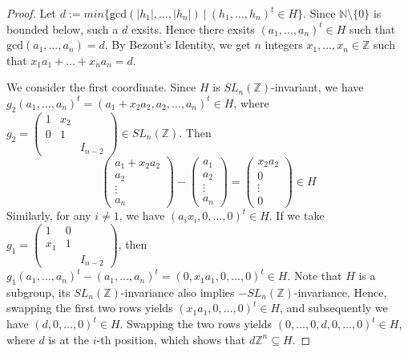 \documentclass[10pt,a4paper]{amsart}
\begin{document}
\begin{proof}

Let $d:=min\{\text{gcd}(\left|h_1\right|,\ldots,\left|h_n\right|)~|~ (h_1,\ldots,h_n)^t \in H\}$. Since $\mathbb{N}\setminus\{0\}$ is bounded below, such a $d$ exsits. Hence there exsits $(a_1,\dots,a_n)^t\in H$ such that $\text{gcd}(a_1,\dots,a_n)=d$. By Bezout’s Identity, we get $n$ integers $x_1,\dots,x_n\in \mathbb{Z}$ such that $x_1a_1+\dots+x_na_n = d$.

We consider the first coordinate. Since $H$ is $SL_{n}(\mathbb{Z})$-invariant, we have $g_2(a_1,\dots,a_n)^t = (a_1+x_2a_2,a_2,\dots,a_n)^t \in H$, where $g_2= \left(\begin{smallmatrix}
     1 & x_2 \\
     0 & 1 \\
     & & I_{n-2}
   \end{smallmatrix}\right)\in SL_{n}(\mathbb{Z})$. Then \begin{equation*}
      \left(\begin{smallmatrix}
           a_1+x_2a_2\\
           a_2\\
           \vdots\\
           a_n
       \end{smallmatrix}\right)-\left(\begin{smallmatrix}
            a_1\\
           a_2\\
           \vdots\\
           a_n
\end{smallmatrix}\right)=\left(\begin{smallmatrix}
            x_2a_2\\
           0\\
           \vdots\\
           0
       \end{smallmatrix}\right)\in H
   \end{equation*}
Similarly, for any $i\ne 1$, we have $(a_ix_i,0,\dots,0)^t \in H$. If we take $g_1= \left(\begin{smallmatrix}
     1 & 0 \\
     x_1 & 1 \\
     & & I_{n-2}
     \end{smallmatrix}\right)$, then $g_1(a_1,\dots,a_n)^t-(a_1,\dots,a_n)^t=(0,x_1a_1,0,\dots,0)^t \in H$. Note that $H$ is a subgroup, its $SL_{n}(\mathbb{Z})$-invariance also implies $-SL_{n}(\mathbb{Z})$-invariance. Hence, swapping the first two rows yields $(x_1a_1,0,\dots,0)^t\in H$, and subsequently we have $(d,0,\dots,0)^t \in H$. Swapping the two rows yields $(0,\dots,0,d,0,\dots,0)^t\in H$, where $d$ is at the $i$-th position, which shows that $d\mathbb{Z}^n \subseteq H$.


\end{proof}
\end{document}
